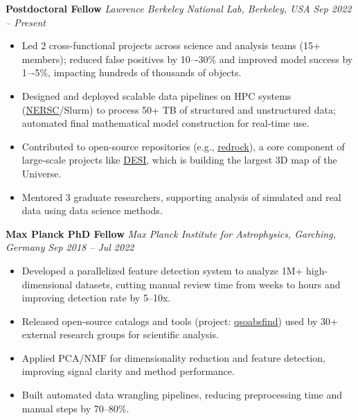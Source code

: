 \documentclass[a4paper,10pt]{article}
\begin{document}
\textbf{Postdoctoral Fellow } \hfill \textit{Lawrence Berkeley National Lab, Berkeley, USA} \hfill \textit{Sep 2022 – Present} 
\begin{itemize}

    \item Led 2 cross-functional projects across science and analysis teams (15+ members); reduced false positives by 10–-30\% and improved model success by 1–-5\%, impacting hundreds of thousands of objects.

    \item Designed and deployed scalable data pipelines on HPC systems (\href{https://www.nersc.gov/}{NERSC}/Slurm) to process 50+ TB of structured and unstructured data; automated final mathematical model construction for real-time use.

     \item Contributed to open-source repositories (e.g., \href{https://github.com/desihub/redrock}{redrock}), a core component of large-scale projects like \href{https://en.wikipedia.org/wiki/Dark_Energy_Spectroscopic_Instrument}{DESI}, which is building the largest 3D map of the Universe.

    \item Mentored 3 graduate researchers, supporting analysis of simulated and real data using data science methods.
    
    \end{itemize}
    
\vspace{2mm}
\textbf{Max Planck PhD Fellow} \hfill \textit{Max Planck Institute for Astrophysics, Garching, Germany} \hfill \textit{Sep 2018 – Jul 2022} 
\begin{itemize}

    \item Developed a parallelized feature detection system to analyze 1M+ high-dimensional datasets, cutting manual review time from weeks to hours and improving detection rate by 5--10x.

    \item Released open-source catalogs and tools (project: \href{https://github.com/abhi0395/qsoabsfind}{qsoabsfind}) used by 30+ external research groups for scientific analysis.

    \item Applied PCA/NMF for dimensionality reduction and feature detection, improving signal clarity and method performance.

    \item Built automated data wrangling pipelines, reducing preprocessing time and manual steps by 70--80\%.
    
\end{itemize}
\end{document}
